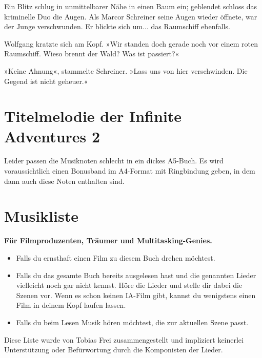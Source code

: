 Ein Blitz schlug in unmittelbarer Nähe in einen Baum ein; geblendet schloss das kriminelle Duo die Augen. Als Marcor Schreiner seine Augen wieder öffnete, war der Junge verschwunden. Er blickte sich um... das Raumschiff ebenfalls.

Wolfgang kratzte sich am Kopf. »Wir standen doch gerade noch vor einem roten Raumschiff. Wieso brennt der Wald? Was ist passiert?«

»Keine Ahnung«, stammelte Schreiner. »Lass uns von hier verschwinden. Die Gegend ist nicht geheuer.«


\chapter{Titelmelodie der Infinite Adventures 2}

Leider passen die Musiknoten schlecht in ein dickes A5-Buch. Es wird voraussichtlich einen Bonusband im A4-Format mit Ringbindung geben, in dem dann auch diese Noten enthalten sind.

%


\chapter{Musikliste}

\textbf{Für Filmproduzenten, Träumer und Multitasking-Genies.}

\begin{itemize}
    \item Falls du ernsthaft einen Film zu diesem Buch drehen möchtest.
    \item Falls du das gesamte Buch bereits ausgelesen hast und die genannten Lieder vielleicht noch gar nicht kennst. Höre die Lieder und stelle dir dabei die Szenen vor. Wenn es schon keinen IA-Film gibt, kannst du wenigstens einen Film in deinem Kopf laufen lassen.
    \item Falls du beim Lesen Musik hören möchtest, die zur aktuellen Szene passt.
\end{itemize}

Diese Liste wurde von Tobias Frei zusammengestellt und impliziert keinerlei Unterstützung oder Befürwortung durch die Komponisten der Lieder.

